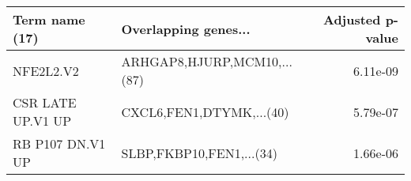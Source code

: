 \begin{tabular}{llr}
\toprule
   Term name (17) &        Overlapping genes... &  Adjusted p-value \\
\midrule
        NFE2L2.V2 & ARHGAP8,HJURP,MCM10,...(87) &          6.11e-09 \\
CSR LATE UP.V1 UP &    CXCL6,FEN1,DTYMK,...(40) &          5.79e-07 \\
 RB P107 DN.V1 UP &    SLBP,FKBP10,FEN1,...(34) &          1.66e-06 \\
\bottomrule
\end{tabular}
